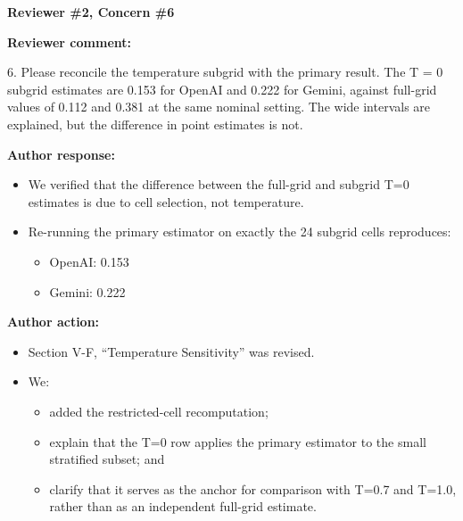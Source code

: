 \documentclass[11pt]{article}
\newcommand{\rvcomment}[1]{{\color{ReviewerGreen}#1}}
\newcommand{\concern}[1]{\textbf{\color{ReviewerGreen}#1}}
\begin{document}
\vspace{12pt}
\concern{Reviewer \#2, Concern \#6}

\concern{Reviewer comment:}

\rvcomment{6. Please reconcile the temperature subgrid with the primary result. The T = 0 subgrid estimates are 0.153 for OpenAI and 0.222 for Gemini, against full-grid values of 0.112 and 0.381 at the same nominal setting. The wide intervals are explained, but the difference in point estimates is not.}

\textbf{Author response:}

\begin{itemize}

\item We verified that the difference between the full-grid and subgrid T=0 estimates is due to cell selection, not temperature.

\item Re-running the primary estimator on exactly the 24 subgrid cells reproduces:

\begin{itemize}

\item OpenAI: 0.153

\item Gemini: 0.222

\end{itemize}

\end{itemize}

\textbf{Author action:}

\begin{itemize}

\item Section V-F, ``Temperature Sensitivity'' was revised.

\item We:

\begin{itemize}

\item added the restricted-cell recomputation;

\item explain that the T=0 row applies the primary estimator to the small stratified subset; and

\item clarify that it serves as the anchor for comparison with T=0.7 and T=1.0, rather than as an independent full-grid estimate.

\end{itemize}

\end{itemize}
\end{document}
